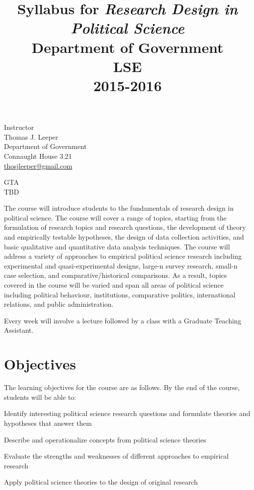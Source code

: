 \documentclass[12pt,a4paper]{article}
\title{Syllabus for \textit{Research Design in Political Science}\\Department of Government\\LSE\\2015-2016}
\begin{document}
\nobibliography*

\maketitle

\faketableofcontents

\begin{minipage}[b]{0.5\linewidth}
Instructor\\
Thomas J. Leeper\\
Department of Government\\
Connaught House 3.21\\
\href{mailto:thosjleeper@gmail.com}{thosjleeper@gmail.com}\\
\end{minipage}
\begin{minipage}[b]{0.5\linewidth}
GTA\\
TBD\\
\end{minipage}


The course will introduce students to the fundamentals of research design in political science. The course will cover a range of topics, starting from the formulation of research topics and research questions, the development of theory and empirically testable hypotheses, the design of data collection activities, and basic qualitative and quantitative data analysis techniques. The course will address a variety of approaches to empirical political science research including experimental and quasi-experimental designs, large-n survey research, small-n case selection, and comparative/historical comparisons. As a result, topics covered in the course will be varied and span all areas of political science including political behaviour, institutions, comparative politics, international relations, and public administration.

Every week will involve a lecture followed by a class with a Graduate Teaching Assistant. 

\clearpage
\section{Objectives}
The learning objectives for the course are as follows. By the end of the course, students will be able to:

\begin{enumerate*}
\item Identify interesting political science research questions and formulate theories and hypotheses that answer them
\item Describe and operationalize concepts from political science theories
\item Evaluate the strengths and weaknesses of different approaches to empirical research
\item Apply political science theories to the design of original research
\end{enumerate*}
\end{document}
